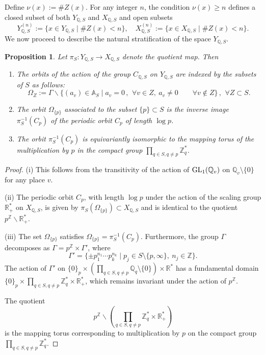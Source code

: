 \documentclass[letterpaper,11pt]{article}
\def\qqq{\,,\,~\forall}
\newcommand{\GL}{{\rm GL}}
\def\A{{\mathbb A}}
\def\Q{{\mathbb Q}}
\def\R{\mathbb{R}}
\def\Z{\mathbb{Z}}
\theoremstyle{plain}
\newtheorem{prop}[thm]{Proposition}
\begin{document}
Define $ \nu(x) := \# Z(x) $. For any integer $ n $, the condition $ \nu(x) \geq n $ defines a closed subset of both $ Y_{\Q,S} $ and $ X_{\Q,S} $ and open subsets  
\[
Y_{\Q,S}^{(n)} := \{x \in Y_{\Q,S} \mid \# Z(x) < n\}, \quad  
X_{\Q,S}^{(n)} := \{x \in X_{\Q,S} \mid \# Z(x) < n\}.  
\]  
We now proceed to describe the natural stratification of the space $ Y_{\Q,S} $.


\begin{prop}\label{ergodic23} Let  $\pi_S:Y_{\Q,S}\to X_{\Q,S}$ denote the quotient map. Then 
\begin{enumerate}
\item[(i)] The orbits of the action of the group $C_{\Q,S}$ on $Y_{\Q,S}$ are indexed by the subsets of $S$ as follows: 
$$
\Omega_Z:=\Gamma\backslash\{(a_v)\in \A_S\mid a_v= 0\qqq v \in Z, \ a_v\neq 0\qquad \forall v \notin Z\}\qqq Z\subset S.
$$
\item[(ii)] The orbit  $\Omega_{\{p\}}$ associated to the subset $\{p\}\subset S$ is  the inverse image $\pi_S^{-1}(C_p)$ of the periodic orbit  $C_p$ of length $\log p$.
\item[(iii)] The orbit $\pi_S^{-1}(C_p)$ is equivariantly isomorphic to the mapping torus of the multiplication by $p$ in the compact group $ \prod_{q\in S,q\neq p} \Z_q^*$.	
\end{enumerate}
\end{prop}
\begin{proof} 
 (i) This follows from the transitivity of the action of $ \GL_1(\Q_v) $ on $ \Q_v \setminus \{0\} $ for any place $ v $.  

(ii) The periodic orbit $ C_p $, with length $ \log p $ under the action of the scaling group $ \R_+^* $ on $ X_{\Q,S} $, is given by $ \pi_S(\Omega_{\{p\}}) \subset X_{\Q,S} $ and is identical to the quotient $ p^\Z \backslash \R_+^* $.  

(iii) The set $ \Omega_{\{p\}} $ satisfies $ \Omega_{\{p\}} = \pi_S^{-1}(C_p) $. Furthermore, the group $ \Gamma $ decomposes as $ \Gamma = p^\Z \times \Gamma' $, where  
\[
\Gamma' = \{ \pm p_1^{n_1} \cdots p_k^{n_k} \mid p_j \in S \setminus \{p, \infty\}, \ n_j \in \Z \}.
\]  
The action of $ \Gamma' $ on $ \{0\}_p \times \left(\prod_{q \in S, q \neq p} \Q_q \setminus \{0\}\right) \times \R^* $ has a fundamental domain $ \{0\}_p \times \prod_{q \in S, q \neq p} \Z_q^* \times \R_+^* $, which remains invariant under the action of $ p^\Z $.  

The quotient  
\[
p^\Z \backslash \left(\prod_{q \in S, q \neq p} \Z_q^* \times \R_+^*\right)
\]  
is the mapping torus corresponding to multiplication by $ p $ on the compact group $ \prod_{q \in S, q \neq p} \Z_q^* $.  \end{proof}
\end{document}
